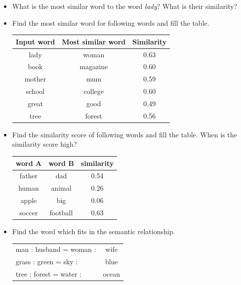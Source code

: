 \documentclass[12pt,fleqn]{article}
\begin{document}
\begin{enumerate}
\begin{itemize} 
 \item What is the most similar word to the word \textit{lady}? What is their similarity? 
 \item Find the most similar word for following words and fill the table. 
 \begin{table}[h] 
  \begin{center} 
     \begin{tabular}{c|c|c}
      Input word & Most similar word & Similarity \\  \hline 
      lady & woman & 0.63 \\ 
      book & magazine & 0.60 \\ 
      mother & mum & 0.59 \\ 
      school & college & 0.60 \\ 
      great & good & 0.49 \\ 
      tree & forest & 0.56 \\ 
     \end{tabular}
  \end{center}
\end{table}
\item Find the similarity score of following words and fill the table. When is the similarity score high? 
\begin{table}[h] 
   \begin{center} 
         \begin{tabular}{c|c|c}
          word A & word B & similarity \\  \hline 
          father & dad & 0.54 \\ 
          human & animal & 0.26 \\ 
          apple & big & 0.06 \\ 
          soccer & football & 0.63 \\ 
         \end{tabular}
   \end{center}
\end{table}

\item Find the word which fits in the semantic relationship.

\begin{table}[h] 
   \begin{center} 
         \begin{tabular}{lc}
man : husband = woman :& wife \\ 
grass : green = sky : & blue \\ 
tree : forest = water : & ocean\\ 
         \end{tabular}
   \end{center}
\end{table}
\end{itemize}
\end{enumerate}  
\end{document}
